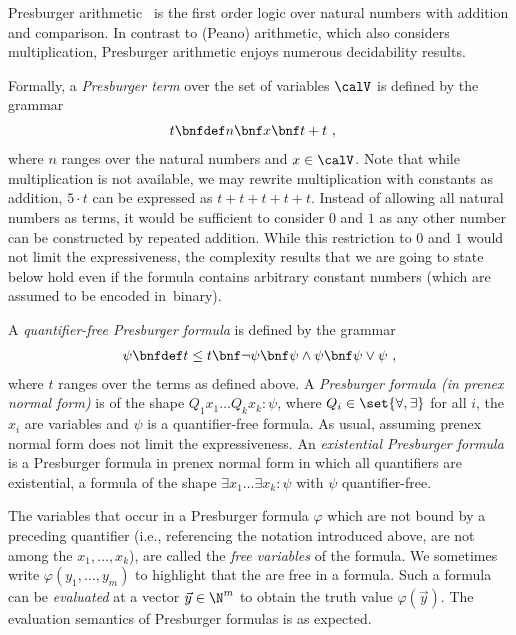\documentclass[../../diss.tex]{subfiles}
\begin{document}
Presburger arithmetic~\cite{Presburger31} is the first order logic over natural numbers with addition and comparison.
In contrast to (Peano) arithmetic, which also considers multiplication, Presburger arithmetic enjoys numerous decidability results.

Formally, a \emph{Presburger term} over the set of variables $\vars$ is defined by the grammar
\begin{align*}
    t & \bnfdef n \bnf x \bnf t+t
    \ ,
\end{align*}
where $n$ ranges over the natural numbers and $x \in \vars$.
Note that while multiplication is not available, we may rewrite multiplication with constants as addition, \eg $5 \cdot t$ can be expressed as $t + t + t + t +t$.
Instead of allowing all natural numbers as terms, it would be sufficient to consider $0$ and $1$ as any other number can be constructed by repeated addition.
While this restriction to $0$ and $1$ would not limit the expressiveness, the complexity results that we are going to state below hold even if the formula contains arbitrary constant numbers (which are assumed to be encoded in~binary).

A \emph{quantifier-free Presburger formula} is defined by the grammar
\begin{align*}
    \psi \bnfdef t\leq t \bnf \neg \psi \bnf \psi \wedge \psi \bnf \psi \vee \psi
    \ ,
\end{align*}
    where $t$ ranges over the terms as defined above.
A \emph{Presburger formula (in prenex normal form)} is of the shape $Q_1 x_1 \ldots Q_k x_k \colon \psi$, where $Q_i \in \set{ \forall, \exists}$ for all $i$, the $x_i$ are variables and $\psi$ is a quantifier-free formula.
As usual, assuming prenex normal form does not limit the expressiveness.
An \emph{existential Presburger formula} is a Presburger formula in prenex normal form in which all quantifiers are existential, \ie a formula of the shape $\exists x_1 \ldots \exists x_k \colon \psi$ with $\psi$ quantifier-free.

The variables that occur in a Presburger formula $\varphi$ which are not bound by a preceding quantifier (i.e., referencing the notation introduced above, are not among the $x_1, \ldots, x_k$), are called the \emph{free variables} of the formula.
We sometimes write $\varphi(y_1, \ldots, y_m)$ to highlight that the  are free in a formula.
Such a formula can be \emph{evaluated} at a vector $\vec{y} \in \N^m$ to obtain the truth value $\varphi(\vec{y})$.
The evaluation semantics of Presburger formulas is as expected.
\end{document}

